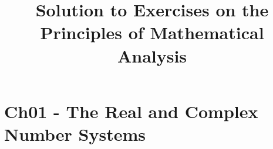 \documentclass{article}
\title{Solution to Exercises on the \\Principles of Mathematical Analysis}
\begin{document}
\maketitle

\section*{Ch01 - The Real and Complex Number Systems}



\end{document}
